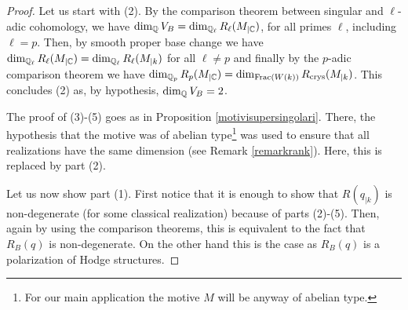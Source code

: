 \begin{proof}
Let us start with (2). By the comparison theorem between singular and $\ell$-adic cohomology, we have ${\dim_{\mathbb{Q}} V_B = \dim_{\mathbb{Q}_\ell}R_\ell(M_{\vert{\mathbb{C}}})}$, for all primes $\ell$, including $\ell=p$.  Then, by smooth proper base change we have   $\dim_{\mathbb{Q}_\ell}R_\ell(M_{\vert{\mathbb{C}}})=\dim_{\mathbb{Q}_\ell}R_\ell(M_{\vert{k}})$ for all $\ell\neq p$ and finally by the $p$-adic comparison theorem we have
 $\dim_{\mathbb{Q}_p}R_p(M_{\vert{\mathbb{C}}})=\dim_{\mathrm{Frac}(W(k))}R_{\textnormal{crys}}(M_{\vert{k}})$. This concludes (2) as, by hypothesis, $\dim_{\mathbb{Q}} V_B=2$.

 The proof of (3)-(5) goes as in Proposition \ref{motivisupersingolari}. There, the hypothesis that the motive was of abelian type\footnote{For our main application the motive $M$ will be anyway of abelian type.} was used to ensure that all  realizations have the same dimension (see Remark \ref{remarkrank}). Here, this is replaced by part (2).

 Let us now show part (1). First notice that it is enough to show that $R(q_{\vert{k}})$ is non-degenerate (for some classical realization) because of parts (2)-(5).
 Then, again by using the comparison theorems, this is equivalent to the fact that $R_B(q)$ is non-degenerate. On the other hand this is the case as $R_B(q)$ is a polarization of Hodge structures.
\end{proof}
